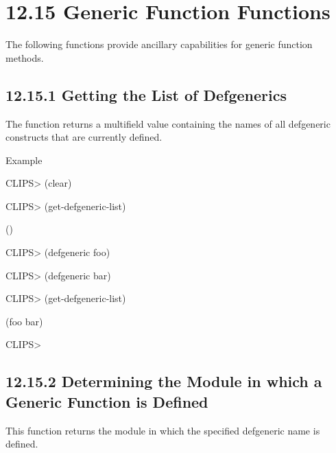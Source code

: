 \documentclass[letterpaper,10pt,english]{sphinxmanual}
\begin{document}

\begin{sphinxVerbatim}[commandchars=\\\{\}]
 
\end{sphinxVerbatim}


\section{12.15 Generic Function Functions}
\label{\detokenize{actions:generic-function-functions}}
The following functions provide ancillary capabilities for generic
function methods.


\subsection{12.15.1 Getting the List of Defgenerics}
\label{\detokenize{actions:getting-the-list-of-defgenerics}}
The function  returns a multifield value
containing the names of all defgeneric constructs that are currently
defined.


\begin{sphinxVerbatim}[commandchars=\\\{\}]
\end{sphinxVerbatim}

Example

CLIPS\textgreater{} (clear)

CLIPS\textgreater{} (get-defgeneric-list)

()

CLIPS\textgreater{} (defgeneric foo)

CLIPS\textgreater{} (defgeneric bar)

CLIPS\textgreater{} (get-defgeneric-list)

(foo bar)

CLIPS\textgreater{}


\subsection{12.15.2 Determining the Module in which a Generic Function is Defined}
\label{\detokenize{actions:determining-the-module-in-which-a-generic-function-is-defined}}
This function returns the module in which the specified defgeneric name
is defined.
\end{document}
